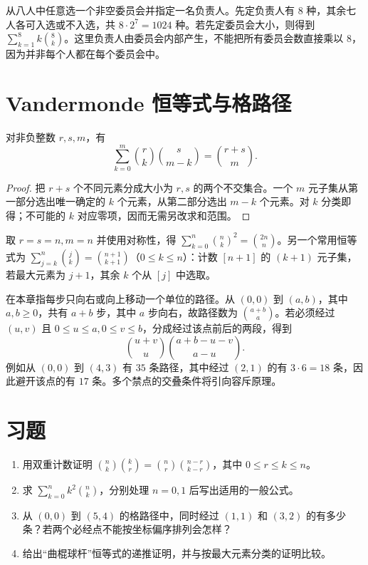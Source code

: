 \documentclass[UTF8,12pt,a4paper,fontset=fandol]{ctexbook}
\begin{document}
\begin{example}
从八人中任意选一个非空委员会并指定一名负责人。先定负责人有 $8$ 种，其余七人各可入选或不入选，共 $8\cdot2^7=1024$ 种。若先定委员会大小，则得到 $\sum_{k=1}^8 k\binom8k$。这里负责人由委员会内部产生，不能把所有委员会数直接乘以 $8$，因为并非每个人都在每个委员会中。
\end{example}

\section{Vandermonde 恒等式与格路径}

\begin{theorem}
对非负整数 $r,s,m$，有
\begin{equation}
  \sum_{k=0}^{m}\binom rk\binom{s}{m-k}=\binom{r+s}{m}.
  \label{eq:vandermonde}
\end{equation}
\end{theorem}
\begin{proof}
把 $r+s$ 个不同元素分成大小为 $r,s$ 的两个不交集合。一个 $m$ 元子集从第一部分选出唯一确定的 $k$ 个元素，从第二部分选出 $m-k$ 个元素。对 $k$ 分类即得；不可能的 $k$ 对应零项，因而无需另改求和范围。
\end{proof}

取 $r=s=n,m=n$ 并使用对称性，得 $\sum_{k=0}^n\binom nk^2=\binom{2n}{n}$。另一个常用恒等式为 $\sum_{j=k}^n\binom jk=\binom{n+1}{k+1}$（$0\le k\le n$）：计数 $[n+1]$ 的 $(k+1)$ 元子集，若最大元素为 $j+1$，其余 $k$ 个从 $[j]$ 中选取。

在本章指每步只向右或向上移动一个单位的路径。从 $(0,0)$ 到 $(a,b)$，其中 $a,b\ge0$，共有 $a+b$ 步，其中 $a$ 步向右，故路径数为 $\binom{a+b}{a}$。若必须经过 $(u,v)$ 且 $0\le u\le a,0\le v\le b$，分成经过该点前后的两段，得到
\[
  \binom{u+v}{u}\binom{a+b-u-v}{a-u}.
\]
例如从 $(0,0)$ 到 $(4,3)$ 有 $35$ 条路径，其中经过 $(2,1)$ 的有 $3\cdot6=18$ 条，因此避开该点的有 $17$ 条。多个禁点的交叠条件将引向容斥原理。

\section{习题}
\begin{enumerate}
  \item\label{ex:identities-1} 用双重计数证明 $\binom nk\binom kr=\binom nr\binom{n-r}{k-r}$，其中 $0\le r\le k\le n$。
  \item\label{ex:identities-2} 求 $\sum_{k=0}^n k^2\binom nk$，分别处理 $n=0,1$ 后写出适用的一般公式。
  \item\label{ex:identities-3} 从 $(0,0)$ 到 $(5,4)$ 的格路径中，同时经过 $(1,1)$ 和 $(3,2)$ 的有多少条？若两个必经点不能按坐标偏序排列会怎样？
  \item\label{ex:identities-4} 给出“曲棍球杆”恒等式的递推证明，并与按最大元素分类的证明比较。
\end{enumerate}
\end{document}
